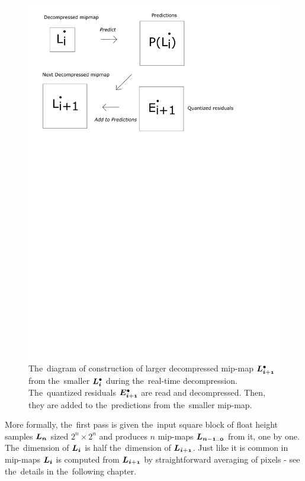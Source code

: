		\begin{figure}
			\includegraphics[trim={0 12cm 1cm 0cm}, clip, width=1\textwidth]{figures/single_decomp.pdf}\centering
			\caption{The~diagram of construction of larger decompressed mip-map $\ldot{i+1}$ from the~smaller $\ldot{i}$ during the~real-time decompression. The~quantized residuals $\objdot{E}{i+1}$ are read and decompressed. Then, they are added to the~predictions from the~smaller mip-map.}
			\label{fig:single_decomp}
		\end{figure}

More formally, the~first pass is given the~input square block of float height samples $\lnorm{n}$ sized $2^n \times 2^n$ and produces $n$ mip-maps $\lnorm{n-1..0}$ from it, one by one. The~dimension of $\lnorm{i}$ is half the~dimension of $\lnorm{i+1}$. Just like it is common in mip-maps $\lnorm{i}$ is computed from $\lnorm{i+1}$ by straightforward averaging of pixels - see the~details in the~following chapter. 

